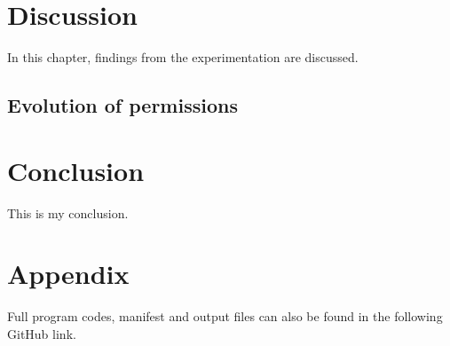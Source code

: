 \documentclass[
  a4paper,  %
  twoside,  %
  bibliography=totoc,
  headsepline,
  cleardoublepage=empty,
  parskip=half,
  draft=false,
  open=any
]{scrbook}
\begin{document}
\chapter{Discussion}
\label{cha:discussion}
In this chapter, findings from the experimentation are discussed.

\section{Evolution of permissions}


\chapter{Conclusion}
\label{cha:conclusion}


This is my conclusion. 

\printbibliography

\appendix
\chapter{Appendix}
Full program codes, manifest and output files can also be found in the following GitHub link.

%

%

%

%
\end{document}
